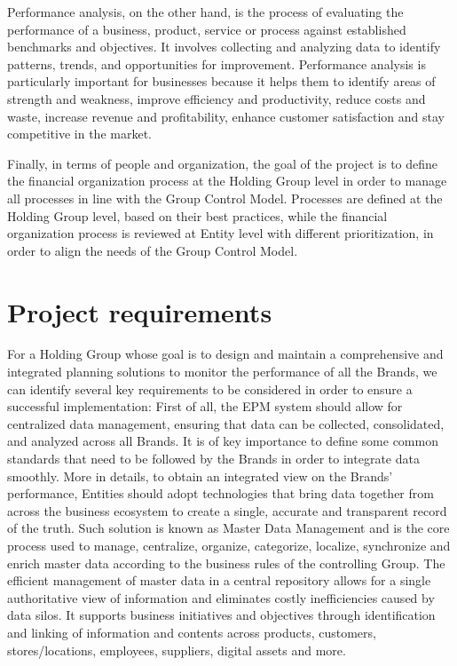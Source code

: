 \documentclass[12pt,a4paper,openright,twoside]{book}
\begin{document}
Performance analysis, on the other hand, is the process of evaluating the performance of a business, product, service or process against established benchmarks and objectives. 
%
It involves collecting and analyzing data to identify patterns, trends, and opportunities for improvement.
%
Performance analysis is particularly important for businesses because it helps them to identify areas of strength and weakness, improve efficiency and productivity, reduce costs and waste, increase revenue and profitability, enhance customer satisfaction and stay competitive in the market.

Finally, in terms of people and organization, the goal of the project is to define the financial organization process at the Holding Group level in order to manage all processes in line with the Group Control Model.
%
Processes are defined at the Holding Group level, based on their best practices, while the financial organization process is reviewed at Entity level with different prioritization, in order to align the needs of the Group Control Model.

\section{Project requirements}

For a Holding Group whose goal is to design and maintain a comprehensive and integrated planning solutions to monitor the performance of all the Brands, we can identify several key requirements to be considered in order to ensure a successful implementation:
%
First of all, the EPM system should allow for centralized data management, ensuring that data can be collected, consolidated, and analyzed across all Brands.
%
It is of key importance to define some common standards that need to be followed by the Brands in order to integrate data smoothly.
%
More in details, to obtain an integrated view on the Brands' performance, Entities should adopt technologies that bring data together from across the business ecosystem to create a single, accurate and transparent record of the truth.
%
Such solution is known as Master Data Management and is the core process used to manage, centralize, organize, categorize, localize, synchronize and enrich master data according to the business rules of the controlling Group.
%
The efficient management of master data in a central repository allows for a single authoritative view of information and eliminates costly inefficiencies caused by data silos.
%
It supports business initiatives and objectives through identification and linking of information and contents across products, customers, stores/locations, employees, suppliers, digital assets and more.
\end{document}
